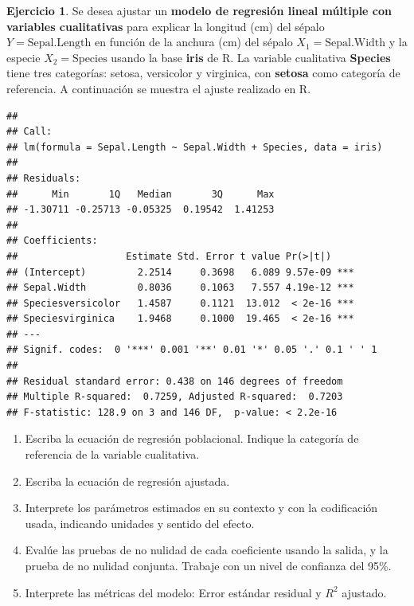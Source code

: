 \documentclass[
  11pt,
]{book}
\theoremstyle{definition}
\theoremstyle{definition}
\theoremstyle{definition}
\newtheorem{exercise}{Ejercicio}[chapter]
\theoremstyle{definition}
\theoremstyle{remark}
\begin{document}
\begin{exercise}

Se desea ajustar un \textbf{modelo de regresión lineal múltiple con variables cualitativas} para explicar la longitud (cm) del sépalo \(Y=\text{Sepal.Length}\) en función de la anchura (cm) del sépalo \(X_1=\text{Sepal.Width}\) y la especie \(X_2=\text{Species}\) usando la base \textbf{iris} de R. La variable cualitativa \textbf{Species} tiene tres categorías: setosa, versicolor y virginica, con \textbf{setosa} como categoría de referencia. A continuación se muestra el ajuste realizado en R.

\begin{verbatim}
## 
## Call:
## lm(formula = Sepal.Length ~ Sepal.Width + Species, data = iris)
## 
## Residuals:
##      Min       1Q   Median       3Q      Max 
## -1.30711 -0.25713 -0.05325  0.19542  1.41253 
## 
## Coefficients:
##                   Estimate Std. Error t value Pr(>|t|)    
## (Intercept)         2.2514     0.3698   6.089 9.57e-09 ***
## Sepal.Width         0.8036     0.1063   7.557 4.19e-12 ***
## Speciesversicolor   1.4587     0.1121  13.012  < 2e-16 ***
## Speciesvirginica    1.9468     0.1000  19.465  < 2e-16 ***
## ---
## Signif. codes:  0 '***' 0.001 '**' 0.01 '*' 0.05 '.' 0.1 ' ' 1
## 
## Residual standard error: 0.438 on 146 degrees of freedom
## Multiple R-squared:  0.7259, Adjusted R-squared:  0.7203 
## F-statistic: 128.9 on 3 and 146 DF,  p-value: < 2.2e-16
\end{verbatim}

\begin{enumerate}
\def\labelenumi{\arabic{enumi}.}
\item
  Escriba la ecuación de regresión poblacional. Indique la categoría de referencia de la variable cualitativa.
\item
  Escriba la ecuación de regresión ajustada.
\item
  Interprete los parámetros estimados en su contexto y con la codificación usada, indicando unidades y sentido del efecto.
\item
  Evalúe las pruebas de no nulidad de cada coeficiente usando la salida, y la prueba de no nulidad conjunta. Trabaje con un nivel de confianza del 95\%.
\item
  Interprete las métricas del modelo: Error estándar residual y \(R^2\) ajustado.
\end{enumerate}

\end{exercise}
\end{document}
